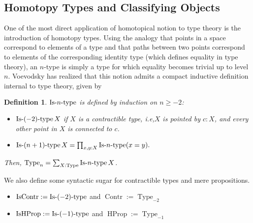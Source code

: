 \documentclass[conference]{IEEEtran}
\newtheorem{defi}[thm]{Definition}
\newcommand{\ie}{i.e,\xspace}
\DeclareMathOperator{\Type}{Type}
\DeclareMathOperator{\HProp}{HProp}
\DeclareMathOperator{\IsHProp}{IsHProp}
\DeclareMathOperator{\Contr}{Contr}
\DeclareMathOperator{\IsContr}{IsContr}
\def\mymathhyphen{{\hbox{-}}}
\newcommand{\IsType}[1]
{\mathop{\mathrm{Is\mymathhyphen}#1\mathrm{\mymathhyphen type}} }
\begin{document}
 
 \subsection{Homotopy Types and Classifying Objects}
\label{ssec:hott}

One of the most direct application of homotopical notion to type
theory is the introduction of homotopy types. 
%
Using the analogy that points in a space correspond to elements of a
type and that paths between two points correspond to 
elements of the corresponding identity type (which defines equality in type theory),  
%
an $n$-type is simply a type
for which equality becomes trivial up to level $n$. 
%
Voevodsky has realized that this notion admits a compact inductive definition
internal to type theory, given by
\begin{defi}
  $\IsType n$ is defined by induction on $n\geqslant -2$:
  \begin{itemize}
  \item $\IsType {(-2)} X$ if $X$ is a contractible type, \ie $X$
    is pointed by $c:X$, and every other point in $X$ is connected to $c$.
  \item $\IsType {(n+1)} X = \prod_{x,y:X} \IsType n (x=y).$
  \end{itemize}
  Then, $\Type_n = \sum_{X:\Type} \IsType n X$.
\end{defi}
%
We also define some syntactic sugar for contractible types and mere propositions.

\begin{itemize}
\item $\IsContr := \IsType {(-2)}$ and $\Contr := \Type_{-2}$
\item $\IsHProp := \IsType {(-1)}$ and $\HProp := \Type_{-1}$
\end{itemize}
\end{document}

